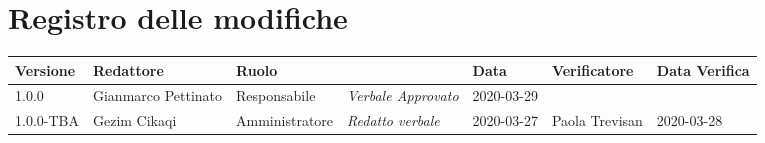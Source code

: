 \section*{Registro delle modifiche}
\renewcommand{\arraystretch}{1.8}

  \setlength\LTleft{-1.7cm}
  \begin{longtable}{|p{1.7cm}|p{2cm}|p{2.5cm}|p{3cm}|p{1.7cm}|p{2cm}|p{2.3cm}|}
    \hline

    \rowcolor{header}
    \textbf{Versione} & \textbf{Redattore} & \textbf{Ruolo} & \centering{\textbf{Descrizione}} & \textbf{Data} & \textbf{Verificatore} & \textbf{Data Verifica}\\

    \hline
    1.0.0 & Gianmarco Pettinato & Responsabile & \small{\textit{Verbale Approvato}} & 2020-03-29 & &\\
	  1.0.0-TBA & Gezim Cikaqi & Amministratore & \small{\textit{Redatto verbale}} & 2020-03-27 & Paola Trevisan  & 2020-03-28 \\
    \hline
  \end{longtable}
  \setlength\LTleft{0cm}
